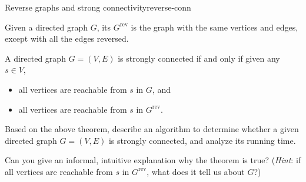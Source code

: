 \documentclass{tufte-handout}
\begin{document}
\begin{model*}{Reverse graphs and strong connectivity}{reverse-conn}

\begin{defn}
  Given a directed graph $G$, its 
  $G^{\mathrm{rev}}$ is the graph with the same vertices and edges,
  except with all the edges reversed.
\end{defn}

\begin{thm} \label{thm:conn-rev}
  A directed graph $G = (V,E)$ is strongly connected if and only if
  given any $s \in V$,
  \begin{itemize}
  \item all vertices are reachable from $s$ in $G$, and
  \item all vertices are reachable from $s$ in $G^{\mathrm{rev}}$.
  \end{itemize}

\end{thm}
\end{model*}


\begin{questions}
\item Based on the above theorem, describe an algorithm to determine
  whether a given directed graph $G = (V,E)$ is strongly connected,
  and analyze its running time. \vspace{2in}

\item Can you give an informal, intuitive explanation why the theorem
  is true? (\emph{Hint}: if all vertices are reachable from $s$ in
  $G^{\mathrm{rev}}$, what does it tell us about $G$?)
\end{questions}

\end{document}

